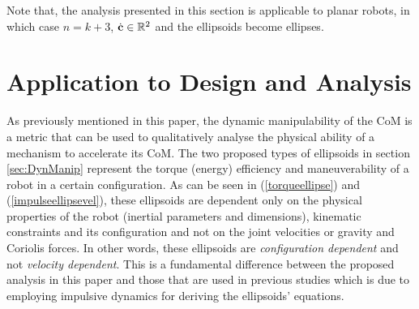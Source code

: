 Note that, the analysis presented in this section is applicable to planar
robots, in which case $n=k+3$, $\dot{\mathbf{c}} \in \mathbb{R}^2$ and the ellipsoids become
ellipses.


\section {Application to Design and Analysis}
\label{sec:application}

As previously mentioned in this paper, the dynamic manipulability of the CoM
is a metric that can be used to qualitatively analyse the physical ability of
a mechanism to accelerate its CoM.  The two proposed types of ellipsoids in
section \ref{sec:DynManip} represent the torque (energy) efficiency and
maneuverability of a robot in a certain configuration.  As can be seen in
(\ref{torqueellipse}) and (\ref{impulseellipsevel}), these ellipsoids are
dependent only on the physical properties of the robot (inertial parameters
and dimensions), kinematic constraints and its configuration and not on the
joint velocities or gravity and Coriolis forces.  In other words, these
ellipsoids are \textit{configuration dependent} and not \textit{velocity
  dependent}.  This is a fundamental difference between the proposed analysis
in this paper and those that are used in previous studies \cite{Cottonetal10,
  Guetal15, Naksuk&Lee06} which is due to employing impulsive dynamics for
deriving the ellipsoids' equations.

